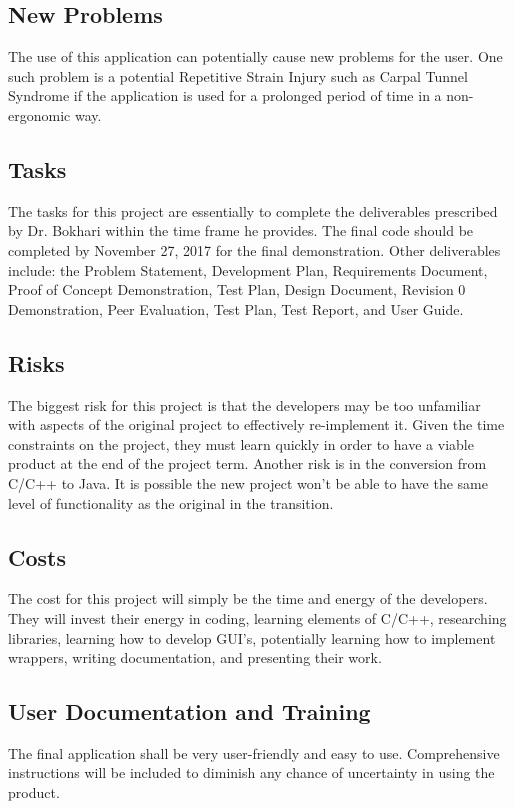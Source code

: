 \documentclass[12pt, titlepage]{article}
\begin{document}
\subsection{New Problems}
\indent \indent The use of this application can potentially cause new problems for the user. One such problem is a potential Repetitive Strain Injury such as Carpal Tunnel Syndrome if the application is used for a prolonged period of time in a non-ergonomic way. 

\subsection{Tasks}
\indent \indent The tasks for this project are essentially to complete the deliverables prescribed by Dr. Bokhari within the time frame he provides. The final code should be completed by November 27, 2017 for the final demonstration. Other deliverables include: the Problem Statement, Development Plan, Requirements Document, Proof of Concept Demonstration, Test Plan, Design Document, Revision 0 Demonstration, Peer Evaluation, Test Plan, Test Report, and User Guide.

\subsection{Risks}
\indent \indent The biggest risk for this project is that the developers may be too unfamiliar with aspects of the original project to effectively re-implement it. Given the time constraints on the project, they must learn quickly in order to have a viable product at the end of the project term. Another risk is in the conversion from C/C++ to Java. It is possible the new project won't be able to have the same level of functionality as the original in the transition.

\subsection{Costs}
\indent \indent The cost for this project will simply be the time and energy of the developers. They will invest their energy in coding, learning elements of C/C++, researching libraries, learning how to develop GUI's, potentially learning how to implement wrappers, writing documentation, and presenting their work.

\subsection{User Documentation and Training}
\indent \indent The final application shall be very user-friendly and easy to use. Comprehensive instructions will be included to diminish any chance of uncertainty in using the product.
\end{document}
